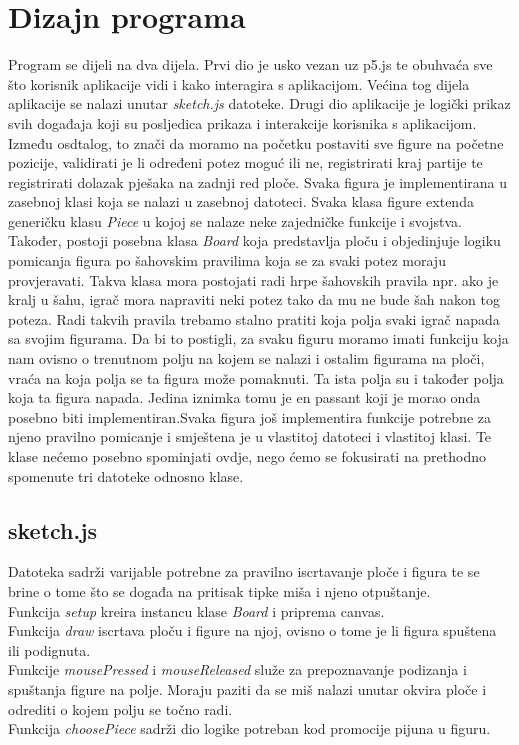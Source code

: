\documentclass[11pt]{article}
\begin{document}
\section{Dizajn programa}
Program se dijeli na dva dijela. Prvi dio je usko vezan uz p5.js te obuhvaća sve što korisnik aplikacije vidi i kako
interagira s aplikacijom. Većina tog dijela aplikacije se nalazi unutar \textit{sketch.js} datoteke. Drugi dio aplikacije je logički prikaz
svih događaja koji su posljedica prikaza i interakcije korisnika s aplikacijom. Između osdtalog, to znači da moramo na početku 
postaviti sve figure na početne pozicije, validirati je li određeni potez moguć ili ne, registrirati kraj partije te
registrirati dolazak pješaka na zadnji red ploče. Svaka figura je implementirana u zasebnoj klasi koja se nalazi u zasebnoj datoteci.
Svaka klasa figure extenda generičku klasu \textit{Piece} u kojoj se nalaze neke zajedničke funkcije i svojstva. Također, postoji posebna
klasa \textit{Board} koja predstavlja ploču i objedinjuje logiku pomicanja figura po šahovskim pravilima koja se za svaki potez moraju
provjeravati. Takva klasa mora postojati radi hrpe šahovskih pravila npr. ako je kralj u šahu, igrač mora napraviti neki potez tako da mu ne
bude šah nakon tog poteza. Radi takvih pravila trebamo stalno pratiti koja polja svaki igrač napada sa svojim figurama. Da bi to postigli,
za svaku figuru moramo imati funkciju koja nam ovisno o trenutnom polju na kojem se nalazi i ostalim figurama na ploči, vraća na koja polja
se ta figura može pomaknuti. Ta ista polja su i također polja koja ta figura napada. Jedina iznimka tomu je en passant koji je morao onda posebno
biti implementiran.Svaka figura još implementira funkcije potrebne za njeno pravilno pomicanje i smještena je u vlastitoj datoteci i vlastitoj klasi.
Te klase nećemo posebno spominjati ovdje, nego ćemo se fokusirati na prethodno spomenute tri datoteke odnosno klase.

\subsection{sketch.js}
Datoteka sadrži varijable potrebne za pravilno iscrtavanje ploče i figura te se brine o tome što se događa na pritisak 
tipke miša i njeno otpuštanje.\\
Funkcija \textit{setup} kreira instancu klase \textit{Board} i priprema canvas.\\
Funkcija \textit{draw} iscrtava ploču i figure na njoj, ovisno o tome je li figura spuštena ili podignuta.\\
Funkcije \textit{mousePressed} i \textit{mouseReleased} služe za prepoznavanje podizanja i spuštanja figure na polje. Moraju paziti da
se miš nalazi unutar okvira ploče i odrediti o kojem polju se točno radi.\\
Funkcija \textit{choosePiece} sadrži dio logike potreban kod promocije pijuna u figuru.\\
\end{document}
